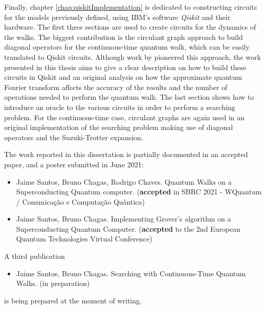 \documentclass[../../dissertation.tex]{subfiles}
\begin{document}
Finally, chapter \ref{chap:qiskitImplementation} is dedicated to constructing
circuits for the models previously defined, using IBM's software
\textit{Qiskit} and their hardware. The first three sections are used to create
circuits for the dynamics of the walks. The biggest contribution is the
circulant graph approach to build diagonal operators for the continuous-time
quantum walk, which can be easily translated to Qiskit circuits. Although work
by \cite{qiang2016} pioneered this approach, the work presented in this thesis
aims to give a clear description on how to build these circuits in Qiskit and
an original analysis on how the approximate quantum Fourier transform affects
the accuracy of the results and the number of operations needed to perform the
quantum walk.
The last section shows how to introduce an oracle to the various circuits in order
to perform a searching problem. For the continuous-time case, circulant graphs
are again used in an original implementation of the searching problem making
use of diagonal operators and the Suzuki-Trotter expansion.\par
The work reported in this dissertation is partially documented in an accepted paper, and a poster submitted in June 2021:
\begin{itemize}
	\item Jaime Santos, Bruno Chagas, Rodrigo Chaves. Quantum Walks on a Superconducting Quantum computer. (\textbf{accepted} in SBRC 2021 - WQuantum / Comunicação e Computação Quântica)
	\item Jaime Santos, Bruno Chagas. Implementing Grover's algorithm on a Superconducting Quantum Computer. (\textbf{accepted} to the 2nd European Quantum Technologies Virtual Conference)
\end{itemize}
A third publication
\begin{itemize}
    \item Jaime Santos, Bruno Chagas. Searching with Continuous-Time Quantum Walks. (in preparation)
\end{itemize}
is being prepared at the moment of writing.
\end{document}
